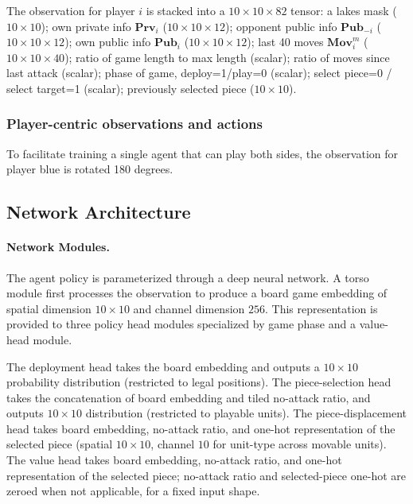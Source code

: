 The observation for player $i$ is stacked into a $10 \times 10 \times 82$ tensor: a lakes mask ($10\times10$); own private info $\textbf{Prv}_i$ ($10\times10\times12$); opponent public info $\textbf{Pub}_{-i}$ ($10\times10\times12$); own public info $\textbf{Pub}_i$ ($10\times10\times12$); last 40 moves $\textbf{Mov}_i^m$ ($10\times10\times40$); ratio of game length to max length (scalar); ratio of moves since last attack (scalar); phase of game, deploy=1/play=0 (scalar); select piece=0 / select target=1 (scalar); previously selected piece ($10\times10$).

\subsubsection{Player-centric observations and actions}
To facilitate training a single agent that can play both sides, the observation for player blue is rotated 180 degrees.

\subsection{Network Architecture}

\paragraph{Network Modules.}
The agent policy is parameterized through a deep neural network. A torso module first processes the observation to produce a board game embedding of spatial dimension $10\times10$ and channel dimension $256$. This representation is provided to three policy head modules specialized by game phase and a value-head module.

The deployment head takes the board embedding and outputs a $10\times10$ probability distribution (restricted to legal positions). The piece-selection head takes the concatenation of board embedding and tiled no-attack ratio, and outputs $10\times10$ distribution (restricted to playable units). The piece-displacement head takes board embedding, no-attack ratio, and one-hot representation of the selected piece (spatial $10\times10$, channel $10$ for unit-type across movable units). The value head takes board embedding, no-attack ratio, and one-hot representation of the selected piece; no-attack ratio and selected-piece one-hot are zeroed when not applicable, for a fixed input shape.

